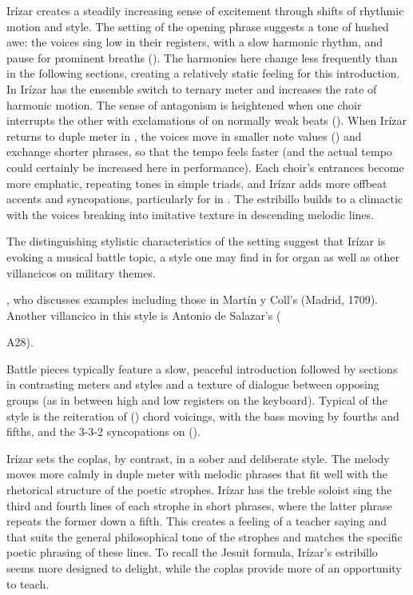 Irízar creates a steadily increasing sense of excitement through shifts of 
rhythmic motion and style.
The setting of the opening phrase suggests a tone of hushed awe: the voices 
sing low in their registers, with a slow harmonic rhythm, and pause for 
prominent breaths ().
The harmonies here change less frequently than in the following sections, 
creating a relatively static feeling for this introduction.
In  Irízar has the ensemble switch to ternary meter and 
increases the rate of harmonic motion.
The sense of antagonism is heightened when one choir interrupts the other with 
exclamations of  on normally weak beats ().
When Irízar returns to duple meter in , the voices move in 
smaller note values () and exchange shorter phrases, so that the 
tempo feels faster (and the actual tempo could certainly be increased here in 
performance).
Each choir's entrances become more emphatic, repeating tones in simple triads, 
and Irízar adds more offbeat accents and syncopations, particularly for 
 in .
The estribillo builds to a climactic  with the voices breaking 
into imitative texture in descending melodic lines.

The distinguishing stylistic characteristics of the setting suggest that Irízar 
is evoking a musical battle topic, a style one may find in  for 
organ as well as other villancicos on military themes.%
\begin{Footnote}
    \Autocites[]{Grove}{Sutton:IberianBatalla}, who discusses 
    examples including those in Martín y Coll's  (Madrid, 1709).
    Another villancico in this style is Antonio de Salazar's  (\signature{MEX-Mc}{A28}).
\end{Footnote}
Battle pieces typically feature a slow, peaceful introduction followed by 
sections in contrasting meters and styles and a texture of dialogue between 
opposing groups (as in between high and low registers on the keyboard). 
Typical of the style is the reiteration of  () chord voicings, with the bass moving by fourths and fifths, and the 
3-3-2 syncopations on  
().

Irízar sets the coplas, by contrast, in a sober and deliberate style.
The melody moves more calmly in duple meter with melodic phrases that fit well 
with the rhetorical structure of the poetic strophes.
Irízar has the treble soloist sing the third and fourth lines of each strophe 
in short phrases, where the latter phrase repeats the former down a fifth.
This creates a feeling of a teacher saying  and 
 that suits the general philosophical tone of the 
strophes and matches the specific poetic phrasing of these lines.
To recall the Jesuit formula, Irízar's estribillo seems more designed to 
delight, while the coplas provide more of an opportunity to teach.

